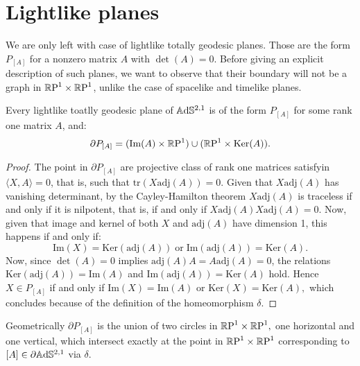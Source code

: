\section{Lightlike planes}
We are only left with case of lightlike totally geodesic planes. Those are the form $P_{[A]}$ for a nonzero matrix $A$ with $\det(A)=0$. Before giving an explicit description of such planes, we want to observe that their boundary will not be a graph in $\T$, unlike the case of spacelike and timelike planes. 

\begin{lemma}
    Every lightlike toatlly geodesic plane of $\A^{2,1}$ is of the form $P_{[A]}$ for some rank one matrix $A$, and: 
    \[
        \partial P_{[A]}=(\text{Im}(A)\times\S)\cup(\S\times\text{Ker}(A)).
    \]
\end{lemma}
\begin{proof}
    The point in $\partial P_{[A]}$ are projective class of rank one matrices satisfyin $\langle X,A\rangle=0$, that is, such that $\text{tr}(X\text{adj}(A))=0.$ Given that $X\text{adj}(A)$ has vanishing determinant, by the Cayley-Hamilton theorem $X\text{adj}(A)$ is traceless if and only if it is nilpotent, that is, if and only if $X\text{adj}(A)X\text{adj}(A)=0.$ Now, given that image and kernel of both $X$ and $\text{adj}(A)$ have dimension 1, this happens if and only if: 
    \begin{equation}
        \text{Im}(X)=\text{Ker}(\text{adj}(A))\;\text{or}\;\text{Im}(\text{adj}(A))=\text{Ker}(A).
    \end{equation}
    Now, since $\det(A)=0$ implies $\text{adj}(A)A=A\text{adj}(A)=0$, the relations $\text{Ker}(\text{adj}(A))=\text{Im}(A)$ and $\text{Im}(\text{adj}(A))=\text{Ker}(A)$ hold. Hence $X\in P_{[A]}$ if and only if $\text{Im}(X)=\text{Im}(A)$ or $\text{Ker}(X)=\text{Ker}(A),$ which concludes because of the definition of the homeomorphism $\delta$.  
\end{proof}

Geometrically $\partial P_{[A]}$ is the union of two circles in $\T,$ one horizontal and one vertical, which intersect exactly at the point in $\T$ corresponding to $[A]\in \partial\A^{2,1}$ via $\delta$.\\

